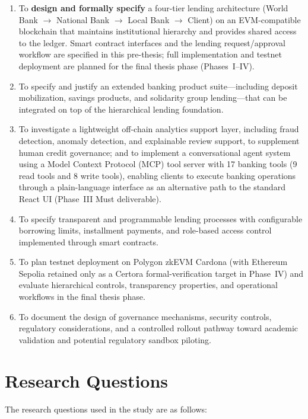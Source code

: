 \documentclass[12pt,a4paper]{report}
\begin{document}
\begin{enumerate}[noitemsep]
\item To \textbf{design and formally specify} a four-tier lending architecture (World Bank $\to$ National Bank $\to$ Local Bank $\to$ Client) on an EVM-compatible blockchain that maintains institutional hierarchy and provides shared access to the ledger. Smart contract interfaces and the lending request/approval workflow are specified in this pre-thesis; full implementation and testnet deployment are planned for the final thesis phase (Phases~I--IV).
\item To specify and justify an extended banking product suite---including deposit mobilization, savings products, and solidarity group lending---that can be integrated on top of the hierarchical lending foundation.
\item To investigate a lightweight off-chain analytics support layer, including fraud detection, anomaly detection, and explainable review support, to supplement human credit governance; and to implement a conversational agent system using a Model Context Protocol (MCP) tool server with 17 banking tools (9 read tools and 8 write tools), enabling clients to execute banking operations through a plain-language interface as an alternative path to the standard React UI (Phase~III Must deliverable).
\item To specify transparent and programmable lending processes with configurable borrowing limits, installment payments, and role-based access control implemented through smart contracts.
\item To plan testnet deployment on Polygon zkEVM Cardona (with Ethereum Sepolia retained only as a Certora formal-verification target in Phase~IV) and evaluate hierarchical controls, transparency properties, and operational workflows in the final thesis phase.
\item To document the design of governance mechanisms, security controls, regulatory considerations, and a controlled rollout pathway toward academic validation and potential regulatory sandbox piloting.
\end{enumerate}

\section{Research Questions}

The research questions used in the study are as follows:
\end{document}
